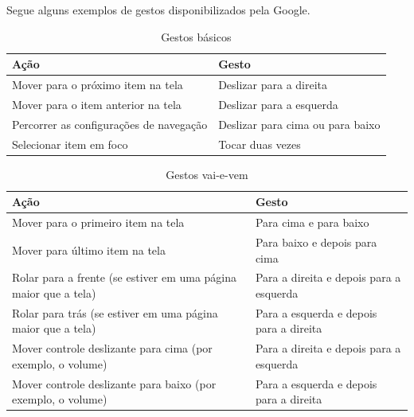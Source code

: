 Segue alguns exemplos de gestos disponibilizados pela Google.

\begin{table}[H]
    \centering
    \begin{tabular}{|l|l|}
        \hline
        \textbf{Ação} & \textbf{Gesto} \\ 
        \hline
        Mover para o próximo item na tela & Deslizar para a direita \\
        \hline
        Mover para o item anterior na tela & Deslizar para a esquerda \\
        \hline
        Percorrer as configurações de navegação	& Deslizar para cima ou para baixo \\
        \hline
        Selecionar item em foco & Tocar duas vezes\\
        \hline
    \end{tabular}
    \caption{Gestos básicos}
    \label{tab:gestos_basicos}
\end{table}

\begin{table}[H]
    \centering
    \begin{tabular}{|p{7cm}|p{7cm}|}
        \hline
        \textbf{Ação} & \textbf{Gesto} \\ 
        \hline
        Mover para o primeiro item na tela & Para cima e para baixo \\
        \hline
        Mover para último item na tela & Para baixo e depois para cima \\
        \hline
        Rolar para a frente
(se estiver em uma página maior que a tela) & Para a direita e depois para a esquerda \\
        \hline
        Rolar para trás
(se estiver em uma página maior que a tela) & Para a esquerda e depois para a direita \\
        \hline
        Mover controle deslizante para cima
(por exemplo, o volume) & Para a direita e depois para a esquerda \\
        \hline
        Mover controle deslizante para baixo
(por exemplo, o volume) & Para a esquerda e depois para a direita \\
        \hline
    \end{tabular}
    \caption{Gestos vai-e-vem}
    \label{tab:gestos_vaievem}
\end{table}

